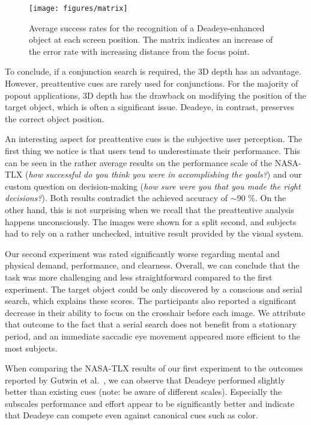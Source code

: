 \documentclass[journal]{vgtc}                %
\begin{document}
\begin{figure}[t]
\centering
\texttt{[image: figures/matrix]}
\caption{Average success rates for the recognition of a Deadeye-enhanced object at each screen position. The matrix indicates an increase of the error rate with increasing distance from the focus point.}
\label{fig:matrix}
\end{figure}

To conclude, if a conjunction search is required, the 3D depth has an advantage. However, preattentive cues are rarely used for conjunctions. For the majority of popout applications, 3D depth has the drawback on modifying the position of the target object, which is often a significant issue. Deadeye, in contrast, preserves the correct object position.

An interesting aspect for preattentive cues is the subjective user perception. The first thing we notice is that users tend to underestimate their performance. This can be seen in the rather average results on the performance scale of the NASA-TLX (\textit{how successful do you think you were in accomplishing the goals?}) and our custom question on decision-making (\textit{how sure were you that you made the right decisions?}). Both results contradict the achieved accuracy of $\sim90$ \%. On the other hand, this is not surprising when we recall that the preattentive analysis happens unconsciously. The images were shown for a split second, and subjects had to rely on a rather unchecked, intuitive result provided by the visual system. 

Our second experiment was rated significantly worse regarding mental and physical demand, performance, and clearness. Overall, we can conclude that the task was more challenging and less straightforward compared to the first experiment. The target object could be only discovered by a conscious and serial search, which explains these scores. The participants also reported a significant decrease in their ability to focus on the crosshair before each image. We attribute that outcome to the fact that a serial search does not benefit from a stationary period, and an immediate saccadic eye movement appeared more efficient to the most subjects.


When comparing the NASA-TLX results of our first experiment to the outcomes reported by Gutwin et al.~\cite{Gutwin:2017:PPI:3025453.3025984}, we can observe that Deadeye performed slightly better than existing cues (note: be aware of different scales). Especially the subscales performance and effort appear to be significantly better and indicate that Deadeye can compete even against canonical cues such as color. 
\end{document}
